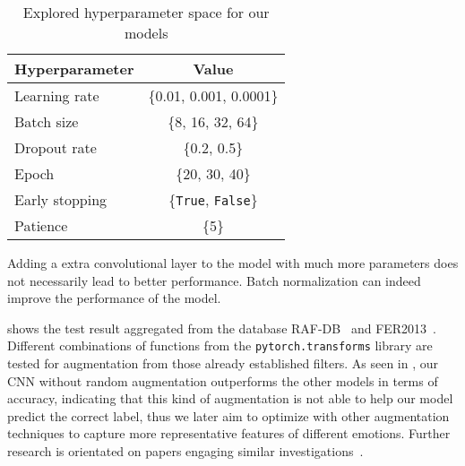 \begin{table*}[ht]
  \centering
  \caption{Overview of the datasets statistics used in our experiment}
  \label{tab:data}
\end{table*}

\begin{table}[ht]
  \centering
  \begin{tabular}{@{}lc@{}}
    \toprule
    Hyperparameter & Value \\
    \midrule
    Learning rate & \{0.01, 0.001, 0.0001\}  \\
    Batch size & \{8, 16, 32, 64\} \\
    Dropout rate & \{0.2, 0.5\} \\
    Epoch & \{20, 30, 40\} \\
    Early stopping & \{\texttt{True}, \texttt{False}\} \\
    Patience & \{5\} \\
    \bottomrule
  \end{tabular}
  \caption{Explored hyperparameter space for our models}
  \label{tab:hyper}
\end{table}

Adding a extra convolutional layer to the model with much more parameters does not necessarily lead to better performance.
Batch normalization can indeed improve the performance of the model. 

 shows the test result aggregated from the database RAF-DB~\cite{kaggle_rafdb} and FER2013~\cite{kaggle_fer}.
Different combinations of functions from the \texttt{pytorch.transforms} library are tested for augmentation from those already established filters. %
As seen in , 
our CNN without random augmentation outperforms the other models in terms of accuracy, 
indicating that this kind of augmentation is not able to help our model predict the correct label, 
thus we later aim to optimize with other augmentation techniques to capture more representative features of different emotions.
Further research is orientated on papers engaging similar investigations~\cite{ZeilerF14,li_reliable_2017,VermaMRMV23}.

